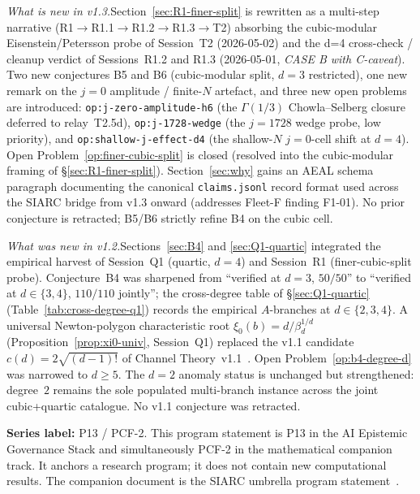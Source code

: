 \documentclass[11pt,a4paper]{article}
\theoremstyle{definition}
\theoremstyle{remark}
\begin{document}
\noindent\textit{What is new in v1.3.}\;\;Section~\ref{sec:R1-finer-split}
is rewritten as a multi-step narrative (R1$\to$R1.1$\to$R1.2$\to$R1.3$\to$T2)
absorbing the cubic-modular Eisenstein/Petersson probe of
Session~T2 (2026-05-02) and the d=4 cross-check / cleanup verdict of
Sessions~R1.2 and R1.3 (2026-05-01, \emph{CASE B with C-caveat}). Two new
conjectures B5 and B6 (cubic-modular split, $d=3$ restricted), one
new remark on the $j=0$ amplitude / finite-$N$ artefact, and three
new open problems are introduced: \texttt{op:j-zero-amplitude-h6} (the
$\Gamma(1/3)$ Chowla--Selberg closure deferred to relay~T2.5d),
\texttt{op:j-1728-wedge} (the $j=1728$ wedge probe, low priority), and
\texttt{op:shallow-j-effect-d4} (the shallow-$N$ $j=0$-cell shift at $d=4$).
Open Problem~\ref{op:finer-cubic-split} is closed (resolved into the
cubic-modular framing of \S\ref{sec:R1-finer-split}). Section~\ref{sec:why}
gains an AEAL schema paragraph documenting the canonical
\texttt{claims.jsonl} record format used across the SIARC bridge from
v1.3 onward (addresses Fleet-F finding F1-01). No prior conjecture is
retracted; B5/B6 strictly refine B4 on the cubic cell.
\smallskip

\noindent\textit{What was new in v1.2.}\;\;Sections~\ref{sec:B4} and
\ref{sec:Q1-quartic} integrated the empirical harvest of
Session~Q1 (quartic, $d=4$) and Session~R1 (finer-cubic-split probe).
Conjecture~B4 was sharpened from ``verified at $d=3$, $50/50$'' to
``verified at $d\in\{3,4\}$, $110/110$ jointly''; the cross-degree
table of \S\ref{sec:Q1-quartic} (Table~\ref{tab:cross-degree-q1})
records the empirical $A$-branches at $d\in\{2,3,4\}$. A universal
Newton-polygon characteristic root $\xi_0(b)=d/\beta_d^{1/d}$
(Proposition~\ref{prop:xi0-univ}, Session~Q1) replaced the v1.1
candidate $c(d)=2\sqrt{(d-1)!}$ of Channel
Theory~v1.1~\cite{Papanokechi2026Channel}. Open
Problem~\ref{op:b4-degree-d} was narrowed to $d\ge 5$. The $d=2$
anomaly status is unchanged but strengthened: degree~$2$ remains the
sole populated multi-branch instance across the joint cubic+quartic
catalogue. No v1.1 conjecture was retracted.
\smallskip

\noindent\textbf{Series label:} P13 / PCF-2.\;
This program statement is P13 in the AI Epistemic Governance Stack and
simultaneously PCF-2 in the mathematical companion track. It anchors a
research program; it does not contain new computational results. The
companion document is the SIARC umbrella program
statement~\cite{Papanokechi2026UMB}.

\tableofcontents
\end{document}
